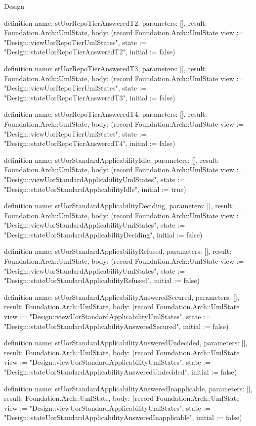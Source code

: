 \begin{lexlean}{Design}
\begin{semanticmodule}
definition{
  name: stUorRepoTierAnsweredT2,
  parameters: [],
  result: Foundation.Arch::UmlState,
  body: (record Foundation.Arch::UmlState {view := "Design::viewUorRepoTierUmlStates", state := "Design::stateUorRepoTierAnsweredT2", initial := false})
}

definition{
  name: stUorRepoTierAnsweredT3,
  parameters: [],
  result: Foundation.Arch::UmlState,
  body: (record Foundation.Arch::UmlState {view := "Design::viewUorRepoTierUmlStates", state := "Design::stateUorRepoTierAnsweredT3", initial := false})
}

definition{
  name: stUorRepoTierAnsweredT4,
  parameters: [],
  result: Foundation.Arch::UmlState,
  body: (record Foundation.Arch::UmlState {view := "Design::viewUorRepoTierUmlStates", state := "Design::stateUorRepoTierAnsweredT4", initial := false})
}

definition{
  name: stUorStandardApplicabilityIdle,
  parameters: [],
  result: Foundation.Arch::UmlState,
  body: (record Foundation.Arch::UmlState {view := "Design::viewUorStandardApplicabilityUmlStates", state := "Design::stateUorStandardApplicabilityIdle", initial := true})
}

definition{
  name: stUorStandardApplicabilityDeciding,
  parameters: [],
  result: Foundation.Arch::UmlState,
  body: (record Foundation.Arch::UmlState {view := "Design::viewUorStandardApplicabilityUmlStates", state := "Design::stateUorStandardApplicabilityDeciding", initial := false})
}

definition{
  name: stUorStandardApplicabilityRefused,
  parameters: [],
  result: Foundation.Arch::UmlState,
  body: (record Foundation.Arch::UmlState {view := "Design::viewUorStandardApplicabilityUmlStates", state := "Design::stateUorStandardApplicabilityRefused", initial := false})
}

definition{
  name: stUorStandardApplicabilityAnsweredSecured,
  parameters: [],
  result: Foundation.Arch::UmlState,
  body: (record Foundation.Arch::UmlState {view := "Design::viewUorStandardApplicabilityUmlStates", state := "Design::stateUorStandardApplicabilityAnsweredSecured", initial := false})
}

definition{
  name: stUorStandardApplicabilityAnsweredUndecided,
  parameters: [],
  result: Foundation.Arch::UmlState,
  body: (record Foundation.Arch::UmlState {view := "Design::viewUorStandardApplicabilityUmlStates", state := "Design::stateUorStandardApplicabilityAnsweredUndecided", initial := false})
}

definition{
  name: stUorStandardApplicabilityAnsweredInapplicable,
  parameters: [],
  result: Foundation.Arch::UmlState,
  body: (record Foundation.Arch::UmlState {view := "Design::viewUorStandardApplicabilityUmlStates", state := "Design::stateUorStandardApplicabilityAnsweredInapplicable", initial := false})
}


\end{semanticmodule}
\end{lexlean}
